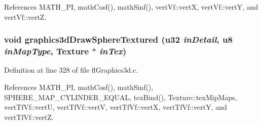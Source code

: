 References MATH\_\-PI, math\-Cosf(), math\-Sinf(), vert\-Vf::vert\-X, vert\-Vf::vert\-Y, and vert\-Vf::vert\-Z.
\subsubsection{\setlength{\rightskip}{0pt plus 5cm}void graphics3d\-Draw\-Sphere\-Textured (u32 {\em in\-Detail}, u8 {\em in\-Map\-Type}, {\bf Texture} $\ast$ {\em in\-Tex})}\label{flGraphics3d_8c_ef33215a17288686665b4450ba241bfc}




Definition at line 328 of file fl\-Graphics3d.c.

References MATH\_\-PI, math\-Cosf(), math\-Sinf(), SPHERE\_\-MAP\_\-CYLINDER\_\-EQUAL, tex\-Bind(), Texture::tex\-Mip\-Maps, vert\-Tf\-Vf::vert\-U, vert\-Tf\-Vf::vert\-V, vert\-Tf\-Vf::vert\-X, vert\-Tf\-Vf::vert\-Y, and vert\-Tf\-Vf::vert\-Z.